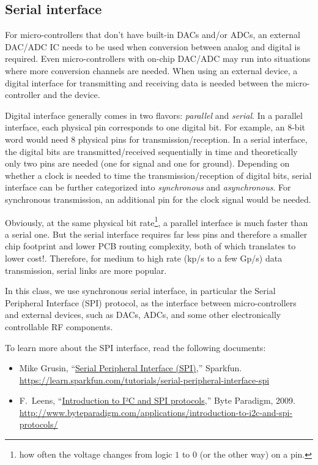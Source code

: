\documentclass[letterpaper, 11pt]{article}
\begin{document}
\subsection{Serial interface}

For micro-controllers that don't have built-in DACs and/or ADCs, an external DAC/ADC IC needs to be used when conversion between analog and digital is required. Even micro-controllers with on-chip DAC/ADC may run into situations where more conversion channels are needed. When using an external device, a digital interface for transmitting and receiving data is needed between the micro-controller and the device. 

Digital interface generally comes in two flavors: \textit{parallel} and \textit{serial}. In a parallel interface, each physical pin corresponds to one digital bit. For example, an 8-bit word would need 8 physical pins for transmission/reception. In a serial interface, the digital bits are transmitted/received sequentially in time and theoretically only two pins are needed (one for signal and one for ground). Depending on whether a clock is needed to time the transmission/reception of digital bits, serial interface can be further categorized into \textit{synchronous} and \textit{asynchronous}. For synchronous transmission, an additional pin for the clock signal would be needed.

Obviously, at the same physical bit rate\footnote{how often the voltage changes from logic $1$ to $0$ (or the other way) on a pin.}, a parallel interface is much faster than a serial one. But the serial interface requires far less pins and therefore a smaller chip footprint and lower PCB routing complexity, both of which translates to lower cost!. Therefore, for medium to high rate (kp/s to a few Gp/s) data transmission, serial links are more popular.

In this class, we use synchronous serial interface, in particular the Serial Peripheral Interface (SPI) protocol, as the interface between micro-controllers and external devices, such as DACs, ADCs, and some other electronically controllable RF components. 

To learn more about the SPI interface, read the following documents:
\begin{itemize}[itemsep=0.1ex]
	\item Mike Grusin, ``\href{https://learn.sparkfun.com/tutorials/serial-peripheral-interface-spi}{Serial Peripheral Interface (SPI)},'' Sparkfun. \url{https://learn.sparkfun.com/tutorials/serial-peripheral-interface-spi}
	\item F.~Leens, ``\href{http://www.byteparadigm.com/applications/introduction-to-i2c-and-spi-protocols/}{Introduction to I²C and SPI protocols},'' Byte Paradigm, 2009. \url{http://www.byteparadigm.com/applications/introduction-to-i2c-and-spi-protocols/}
\end{itemize}
\end{document}
